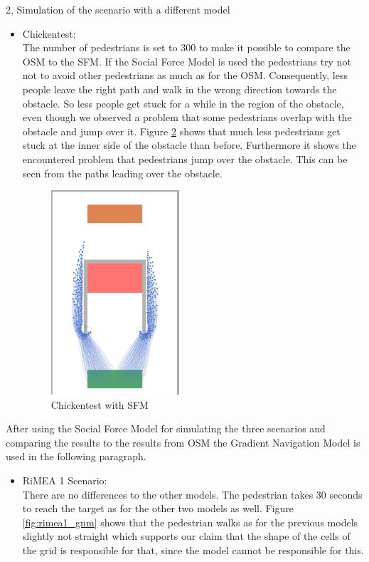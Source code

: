 \documentclass[10pt,a4paper]{article}
\begin{document}
\begin{task}{2, Simulation of the scenario with a different model}
\begin{itemize}
\begin{figure}[H]
        \caption{RiMEA scenario showing the corner with SFM}
        \label{fig:rimea6_sfm2}
    \end{figure}
    \item Chickentest:\\
    The number of pedestrians is set to 300 to make it possible to compare the OSM to the SFM. If the Social Force Model is used the pedestrians try not not to avoid other pedestrians as much as for the OSM. Consequently, less people leave the right path and walk in the wrong direction towards the obstacle. So less people get stuck for a while in the region of the obstacle, even though we observed a problem that some pedestrians overlap with the obstacle and jump over it. Figure \ref{fig:chickentest_sfm} shows that much less pedestrians get stuck at the inner side of the obstacle than before. Furthermore it shows the encountered problem that pedestrians jump over the obstacle. This can be seen from the paths leading over the obstacle.
    \begin{figure}[H]
        \centering
        \includegraphics[width=0.45\textwidth]{pictures/sfm/chicken.png}
        \caption{Chickentest with SFM}
        \label{fig:chickentest_sfm}
    \end{figure}
\end{itemize}
After using the Social Force Model for simulating the three scenarios and comparing the results to the results from OSM the Gradient Navigation Model is used in the following paragraph.
\begin{itemize}
    \item RiMEA 1 Scenario:\\
    There are no differences to the other models. The pedestrian takes 30 seconds to reach the target as for the other two models as well. Figure \ref{fig:rimea1_gnm} shows that the pedestrian walks as for the previous models slightly not straight which supports our claim that the shape of the cells of the grid is responsible for that, since the model cannot be responsible for this.

\end{itemize}
\end{task}
\end{document}
